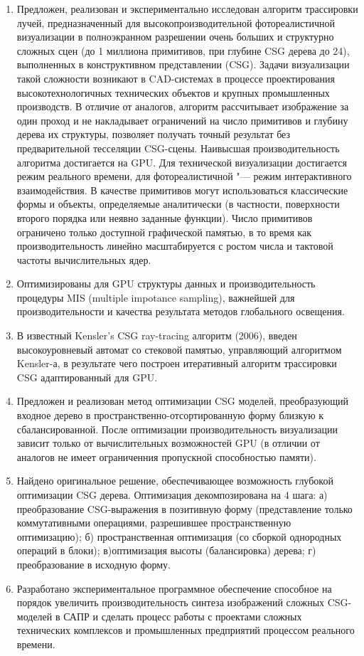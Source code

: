 \begin{enumerate}
  \item Предложен, реализован и экспериментально исследован алгоритм трассировки лучей, предназначенный для высокопроизводительной фотореалистичной визуализации в полноэкранном разрешении очень больших и структурно сложных сцен (до 1 миллиона примитивов, при глубине CSG дерева до 24), выполненных в конструктивном представлении (CSG). Задачи визуализации такой сложности возникают в CAD-системах в процессе проектирования высокотехнологичных технических объектов и крупных промышленных производств. В отличие от аналогов, алгоритм рассчитывает изображение за один проход и не накладывает ограничений на число примитивов и глубину дерева их структуры, позволяет получать точный результат без предварительной тесселяции CSG-сцены. Наивысшая производительность алгоритма достигается на GPU. Для технической визуализации достигается режим  реального времени, для фотореалистичной "--- режим интерактивного взаимодействия. В качестве примитивов могут использоваться классические формы и объекты, определяемые аналитически (в частности, поверхности второго порядка или неявно заданные функции). Число примитивов ограничено только доступной графической памятью, в то время как производительность линейно масштабируется с ростом числа и тактовой частоты вычислительных ядер.

  \item Оптимизированы для GPU структуры данных и производительность процедуры MIS (multiple impotance sampling), важнейшей для производительности и качества результата методов глобального освещения.

  \item В известный Kensler's CSG ray-tracing алгоритм (2006), введен высокоуровневый автомат со стековой памятью, управляющий алгоритмом Kensler-а, в результате чего построен итеративный алгоритм трассировки CSG адаптированный для GPU.

  \item Предложен и реализован метод оптимизации CSG моделей, преобразующий входное дерево в пространственно-отсортированную форму близкую к сбалансированной. После оптимизации производительность визуализации зависит только от вычислительных возможностей GPU (в отличии от аналогов не имеет ограниченния пропускной способностью памяти).

  \item Найдено оригинальное решение, обеспечивающее возможность глубокой оптимизации CSG дерева. Оптимизация декомпозирована на 4 шага: а) преобразование CSG-выражения в позитивную форму (представление только коммутативными операциями, разрешившее пространственную оптимизацию); б) пространственная оптимизация (со сборкой однородных операций в блоки); в)оптимизация высоты (балансировка) дерева; г) преобразование в исходную форму.

  \item Разработано экспериментальное программное обеспечение способное на порядок увеличить производительность синтеза изображений сложных CSG-моделей в САПР и сделать процесс работы с проектами сложных технических комплексов и промышленных предприятий процессом реального времени.

\end{enumerate}
